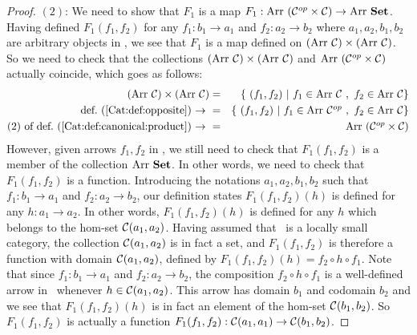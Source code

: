 \begin{proof}
    $(2)$: We need to show that $F_{1}$ is a map $F_{1}:\mbox{\rm Arr}\ (\mbox{${\cal C}^{op}$}\times\mbox{$\cal C$})
    \to\mbox{\rm Arr}\ \mbox{\bf Set}$. Having defined $F_{1}(f_{1},f_{2})$ for any $f_{1}:b_{1}\to
    a_{1}$ and $f_{2}:a_{2}\to b_{2}$ where $a_{1},a_{2},b_{1},b_{2}$ are 
    arbitrary objects in \Cat, we see that $F_{1}$ is a map defined 
    on $(\arr\ \Cat)\times(\arr\ \Cat)$. So we need to check that the collections
    $(\arr\ \Cat)\times(\arr\ \Cat)$ and $\mbox{\rm Arr}\ (\mbox{${\cal C}^{op}$}\times\mbox{$\cal C$})$ actually
    coincide, which goes as follows:
        \begin{eqnarray*}(\arr\ \Cat)\times(\arr\ \Cat)
            &=&\{\ (f_{1},f_{2})\ |\ f_{1}\in\arr\ \Cat\ ,\ f_{2}\in\arr\ \Cat\}\\
            \mbox{def.~(\ref{Cat:def:opposite})\ $\to$\ }
            &=&\{\ (f_{1},f_{2})\ |\ f_{1}\in\arr\ \Cop\ ,\ f_{2}\in\arr\ \Cat\}\\
            \mbox{$(2)$ of def.~(\ref{Cat:def:canonical:product})\ $\to$\ }
            &=&\arr\ (\Cop\times\Cat)
        \end{eqnarray*}
    However, given arrows $f_{1}, f_{2}$ in \Cat, we still need to check that
    $F_{1}(f_{1},f_{2})$ is a member of the collection $\arr\ \Set$. In other
    words, we need to check that $F_{1}(f_{1},f_{2})$ is a function. Introducing
    the notations $a_{1},a_{2},b_{1},b_{2}$ such that $f_{1}:b_{1}\to a_{1}$ and
    $f_{2}:a_{2}\to b_{2}$, our definition states $F_{1}(f_{1},f_{2})(h)$ is
    defined for any $h:a_{1}\to a_{2}$. In other words, $F_{1}(f_{1},f_{2})(h)$
    is defined for any $h$ which belongs to the hom-set $\mbox{$\cal C$}(a_{1},a_{2})$.
    Having assumed that \Cat\ is a locally small category, the collection
    $\mbox{$\cal C$}(a_{1},a_{2})$ is in fact a set, and $F_{1}(f_{1},f_{2})$ is
    therefore a function with domain $\mbox{$\cal C$}(a_{1},a_{2})$, defined by
    $F_{1}(f_{1},f_{2})(h)=f_{2}\circ h\circ f_{1}$. Note that since
    $f_{1}:b_{1}\to a_{1}$ and $f_{2}:a_{2}\to b_{2}$, the composition
    $f_{2}\circ h\circ f_{1}$ is a well-defined arrow in \Cat\ whenever 
    $h\in\mbox{$\cal C$}(a_{1},a_{2})$. This arrow has domain $b_{1}$ and codomain 
    $b_{2}$ and we see that $F_{1}(f_{1},f_{2})(h)$ is in fact an element
    of the hom-set $\mbox{$\cal C$}(b_{1},b_{2})$. So $F_{1}(f_{1},f_{2})$ is actually
    a function $F_{1}(f_{1},f_{2}):\mbox{$\cal C$}(a_{1},a_{1})\to\mbox{$\cal C$}(b_{1},b_{2})$.
 
\end{proof}
